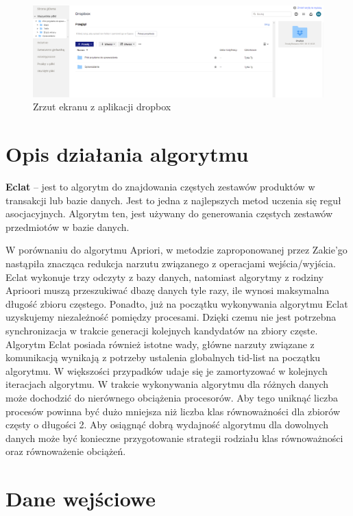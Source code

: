 \documentclass{article}
\begin{document}
		\begin{figure}[!h]
			\centering
			\includegraphics[scale=0.25]{Dropbox.png}
			\caption{Zrzut ekranu z aplikacji dropbox}
		\end{figure}
		
	\newpage
	
	\section{Opis działania algorytmu}

\textbf{Eclat} – jest to algorytm do znajdowania częstych zestawów produktów w transakcji lub bazie danych. Jest to jedna z najlepszych metod uczenia się reguł asocjacyjnych. Algorytm ten, jest używany do generowania częstych zestawów przedmiotów w bazie danych. 

W porównaniu do algorytmu Apriori, w metodzie zaproponowanej przez Zakie’go nastąpiła znacząca redukcja narzutu związanego z operacjami wejścia/wyjścia. Eclat wykonuje trzy odczyty z bazy danych, natomiast algorytmy z rodziny Aprioori muszą przeszukiwać dbazę danych tyle razy, ile wynosi maksymalna długość zbioru częstego. Ponadto, już na początku wykonywania algorytmu Eclat uzyskujemy niezależność pomiędzy procesami. Dzięki czemu nie jest potrzebna synchronizacja w trakcie generacji kolejnych kandydatów na zbiory częste. Algorytm Eclat posiada również istotne wady, główne narzuty związane z komunikacją wynikają z potrzeby ustalenia globalnych tid-list na początku algorytmu. W większości przypadków udaje się je zamortyzować w kolejnych iteracjach algorytmu. W trakcie wykonywania algorytmu dla różnych danych może dochodzić do nierównego obciążenia procesorów. Aby tego uniknąć liczba procesów powinna być dużo mniejsza niż liczba klas równoważności dla zbiorów częsty o długości 2. Aby osiągnąć dobrą wydajność algorytmu dla dowolnych danych może być konieczne przygotowanie strategii rodziału klas równoważności oraz równoważenie obciążeń. 

	\newpage
	\section{Dane wejściowe}
\end{document}
